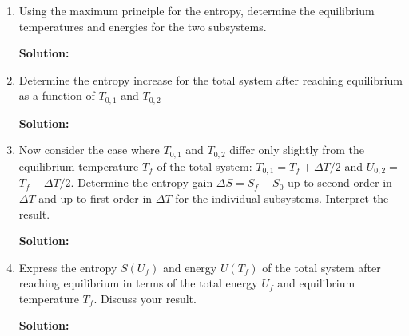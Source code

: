 \documentclass[10pt]{article}
\newenvironment{Solution}
    {\textbf{Solution:}
    
    \vspace{5mm}
    \begin{tcolorbox}
    }
    {
    \end{tcolorbox}
    \vspace{5mm}
    }
\begin{document}
\begin{enumerate}
\begin{enumerate}
\begin{Solution}
\begin{equation}
    S_a =  C \ln{\frac{\left(\frac{U_{a,1}}{C} - 2 T_{0,1} \right) \left(\frac{U_{a,2}}{C}\right)}{T_{0,1}T_{0,2}}} 
\end{equation}
Now recall that $U = U_1 + U_2$,  so 
\begin{align}
    S_a &=  C \ln{\frac{\left(\frac{U_{a,1}}{C} - 2 T_{0,1} \right) \left(\frac{U_a - U_{a,1} }{C}\right)}{T_{0,1}T_{0,2}}}\\
    &\boxed{= C \ln{\frac{U_{a}U_{a,1} + 2CT_{0,1}U_{a,1} - U_{a,1}^2 - 2CT_{0,1}U_{a}}{C^2 T_{0,1}T_{0,2}}}}
\end{align}
The total internal energy is conserved, so it is a constant. The initial temperatures and $C$ are also constant. Thus, $S$ is only a function of $U_1$ and has the form,
\begin{align}
    S_a = C \ln{a U_{a,1} - bU_{a,1}^2 + c}
\end{align}
\end{Solution}

\item Using the maximum principle for the entropy, determine the equilibrium temperatures and energies for the two subsystems.

\begin{Solution}


\end{Solution}

\item Determine the entropy increase for the total system after reaching equilibrium as a function of $T_{0, 1}$ and $T_{0, 2}$

\begin{Solution}


\end{Solution}

\item Now consider the case where $T_{0, 1}$ and $T_{0, 2}$ differ only slightly from the equilibrium temperature $T_{f}$ of the total system: $T_{0, 1}=T_{f}+\Delta T / 2$ and $U_{0, 2}=$ $T_{f}-\Delta T / 2 .$ Determine the entropy gain $\Delta S=S_{f}-S_{0}$ up to second order in $\Delta T$ and $\mathrm{up}$ to first order in $\Delta T$ for the individual subsystems. Interpret the result.

\begin{Solution}


\end{Solution}

\item Express the entropy $S\left(U_{f}\right)$ and energy $U\left(T_{f}\right)$ of the total system after reaching equilibrium in terms of the total energy $U_{f}$ and equilibrium temperature $T_{f} .$ Discuss your result.

\begin{Solution}


\end{Solution}
    
\end{enumerate}
\end{enumerate}
\end{document}
